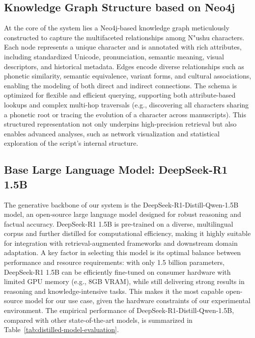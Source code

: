 \documentclass{article}
\begin{document}
\subsection{Knowledge Graph Structure based on Neo4j}
\label{ssec:kg_structure}
    At the core of the system lies a Neo4j-based knowledge graph meticulously constructed to capture the multifaceted relationships among N"{u}shu characters. Each node represents a unique character and is annotated with rich attributes, including standardized Unicode, pronunciation, semantic meaning, visual descriptors, and historical metadata. Edges encode diverse relationships such as phonetic similarity, semantic equivalence, variant forms, and cultural associations, enabling the modeling of both direct and indirect connections. The schema is optimized for flexible and efficient querying, supporting both attribute-based lookups and complex multi-hop traversals (e.g., discovering all characters sharing a phonetic root or tracing the evolution of a character across manuscripts). This structured representation not only underpins high-precision retrieval but also enables advanced analyses, such as network visualization and statistical exploration of the script's internal structure.



\subsection{Base Large Language Model: DeepSeek-R1 1.5B}
\label{ssec:deepseek_model}
    The generative backbone of our system is the DeepSeek-R1-Distill-Qwen-1.5B model\cite{deepseek-aiDeepSeekR1IncentivizingReasoning2025}, an open-source large language model designed for robust reasoning and factual accuracy. DeepSeek-R1 1.5B is pre-trained on a diverse, multilingual corpus and further distilled for computational efficiency, making it highly suitable for integration with retrieval-augmented frameworks and downstream domain adaptation. A key factor in selecting this model is its optimal balance between performance and resource requirements: with only 1.5 billion parameters, DeepSeek-R1 1.5B can be efficiently fine-tuned on consumer hardware with limited GPU memory (e.g., 8GB VRAM), while still delivering strong results in reasoning and knowledge-intensive tasks. This makes it the most capable open-source model for our use case, given the hardware constraints of our experimental environment.
    The empirical performance of DeepSeek-R1-Distill-Qwen-1.5B, compared with other state-of-the-art models, is summarized in Table~\ref{tab:distilled-model-evaluation}.
\end{document}
